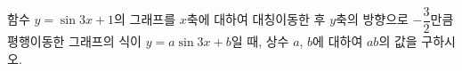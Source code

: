 함수 $y=\sin 3x+1$의 그래프를 $x$축에 대하여 대칭이동한 후 $y$축의 방향으로 $-\dfrac{3}{2}$만큼 평행이동한 그래프의 식이 $y=a\sin 3x+b$일 때, 상수 $a$, $b$에 대하여 $ab$의 값을 구하시오.

